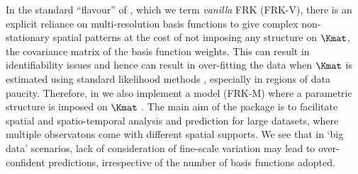 In the standard ``flavour'' of  \citep{Cressie_2008}, which we term \emph{vanilla} FRK (FRK-V), there is an explicit reliance on multi-resolution basis functions to give complex non-stationary spatial patterns at the cost of not imposing any structure on $\Kmat$, the covariance matrix of the basis function weights. This can result in identifiability issues and hence can result in over-fitting the data when $\Kmat$ is estimated using standard likelihood methods  \citep[e.g.,][]{Nguyen_2014}, especially in regions of data paucity. Therefore, in  we also implement a model (FRK-M) where a parametric structure is imposed on $\Kmat$ \citep[e.g.,][]{Stein_2008,Nychka_2015}. The main aim of the package  is to facilitate spatial and spatio-temporal analysis and prediction for large datasets, where multiple observatons come with different spatial supports. We see that in `big data' scenarios, lack of consideration of fine-scale variation may lead to over-confident predictions, irrespective of the number of basis functions adopted.

%

